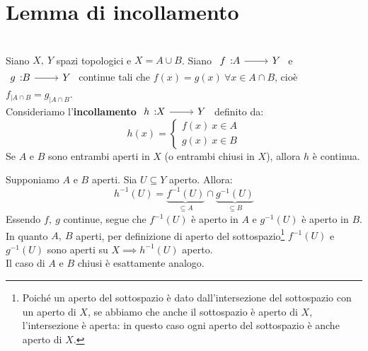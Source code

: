 \section{Lemma di incollamento}
\begin{lemming}~{}\label{lemmaincollamento}\\
Siano $X,\ Y$ spazi topologici e $X=A\cup B$. Siano $\funz{f}{A}{Y}$ e $\funz{g}{B}{Y}$ continue tali che $f\left(x\right)=g\left(x\right)\ \forall x\in A\cap B$, cioè $f_{\mid A\cap B}=g_{\mid A\cap B}$.\\
Consideriamo l'\textbf{incollamento} $\funz{h}{X}{Y}$ definito da:
	\begin{equation}
		h\left(x\right)=\begin{cases}
			f\left(x\right)\ x\in A\\
			g\left(x\right)\ x\in B
		\end{cases}
	\end{equation}
	Se $A$ e $B$ sono entrambi aperti in $X$ (o entrambi chiusi in $X$), allora $h$ è continua.
\end{lemming}
\begin{demonstration}
	Supponiamo $A$ e $B$ aperti. Sia $U\subseteq Y$ aperto. Allora:
	\begin{equation*}
		h^{-1}\left(U\right)=\underbrace{f^{-1}\left(U\right)}_{\subseteq A}\cap \underbrace{g^{-1}\left(U\right)}_{\subseteq B}
	\end{equation*}
Essendo $f,\ g$ continue, segue che $f^{-1}\left(U\right)$ è aperto in $A$ e $g^{-1}\left(U\right)$ è aperto in $B$.\\
In quanto $A,\ B$ aperti, per definizione di aperto del sottospazio\footnote{Poiché un aperto del sottospazio è dato dall'intersezione del sottospazio con un aperto di $X$, se abbiamo che anche il sottospazio è aperto di $X$, l'intersezione è aperta: in questo caso ogni aperto del sottospazio è anche aperto di $X$.} $f^{-1}\left(U\right)$ e $g^{-1}\left(U\right)$ sono aperti su $X\implies h^{-1}\left(U\right)$ aperto.\\
Il caso di $A$ e $B$ chiusi è esattamente analogo.
\end{demonstration}
